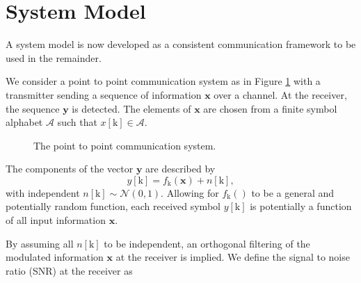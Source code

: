 \par

\section{System Model}

A system model is now developed as a consistent communication framework to be used in the remainder.
\par
We consider a point to point communication system as in Figure \ref{fig:model} with a transmitter sending a sequence of information $\mathbf{x}$ over a channel. At the receiver, the sequence  $\mathbf{y}$ is detected. 
The elements of $\mathbf{x}$ are chosen from a finite symbol alphabet $\mathcal{A}$ such that $x[\text{k}] \in \mathcal{A}$.

\begin{figure}[H]
\caption{The point to point communication system.}
\label{fig:model}
\end{figure}

The components of the vector $\mathbf{y}$ are described by 
\begin{equation*}
y[\text{k}] = f_{\text{k}}(\mathbf{x}) + n[\text{k}],
\end{equation*}
with independent $n[\text{k}]\sim \mathcal{N}(0,1).$
Allowing for $f_{\text{k}}()$ to be a general and potentially random function, each received symbol $y[\text{k}]$ is potentially a function of all input information $\mathbf{x}$.

By assuming all $n[\text{k}]$ to be independent, an orthogonal filtering of the modulated information $\mathbf{x}$ at the receiver is implied. We define the signal to noise ratio (SNR) at the receiver as 

